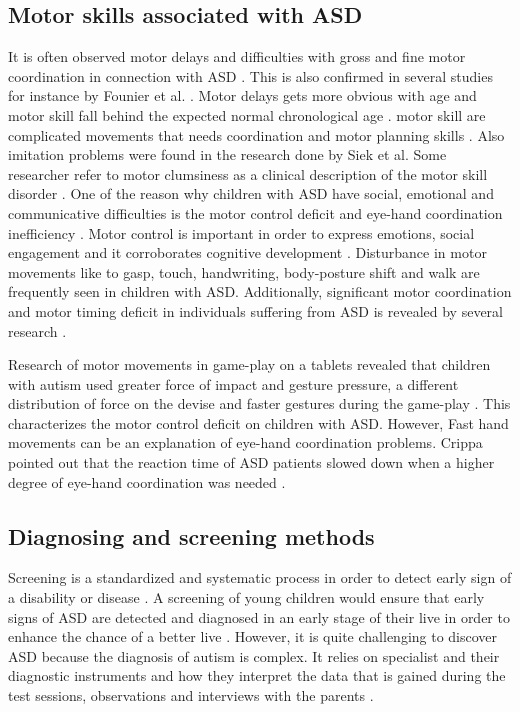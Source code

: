 \subsection{Motor skills associated with ASD}

It is often observed motor delays and difficulties with gross and fine motor coordination in connection with ASD \cite{McCleery2013}. This is also confirmed in several studies for instance by Founier et al. \cite{Fournier2010}. Motor delays gets more obvious with age and motor skill fall behind the expected normal chronological age \cite{Lloyd2013}. motor skill are complicated movements that needs coordination and motor planning skills \cite{Lloyd2013}. 
Also imitation problems were found in the research done by Siek et al. \cite{Siek2005}
Some researcher refer to motor clumsiness as a clinical description of the motor skill disorder \cite{Lloyd2013}. %
One of the reason why children with ASD have social, emotional and communicative difficulties is the motor control deficit and eye-hand coordination inefficiency \cite{Crippa2013}. Motor control is important in order to express emotions, social engagement and it corroborates cognitive development \cite{Anzulewicz2016}. 
Disturbance in motor movements like to gasp, touch, handwriting, body-posture shift and walk are frequently seen in children with ASD. Additionally, significant motor coordination and motor timing deficit in individuals suffering from ASD is revealed by several research \cite{Anzulewicz2016}.

Research of motor movements in game-play on a tablets revealed that children with autism used greater force of impact and gesture pressure, a different distribution of force on the devise and faster gestures during the game-play \cite{Anzulewicz2016}. This characterizes the motor control deficit on children with ASD. However,  Fast hand movements can be an explanation of eye-hand coordination problems. Crippa pointed out that the reaction time of ASD patients slowed down  when a higher degree of eye-hand coordination was needed \cite{Crippa2013}.




\subsection{Diagnosing and screening methods}

Screening is a standardized and systematic process in order to detect early sign of a disability or disease \cite{screening}. A screening of young children would ensure that early signs of ASD are detected and diagnosed in an early stage of their live in order to enhance the chance of a better live \cite{Zwaigenbaum2015}.
However, it is quite challenging to discover ASD because the diagnosis of autism is complex. It relies on specialist and their diagnostic instruments and how they interpret the data that is gained during the test sessions, observations and interviews with the parents \cite{Anzulewicz2016}.


